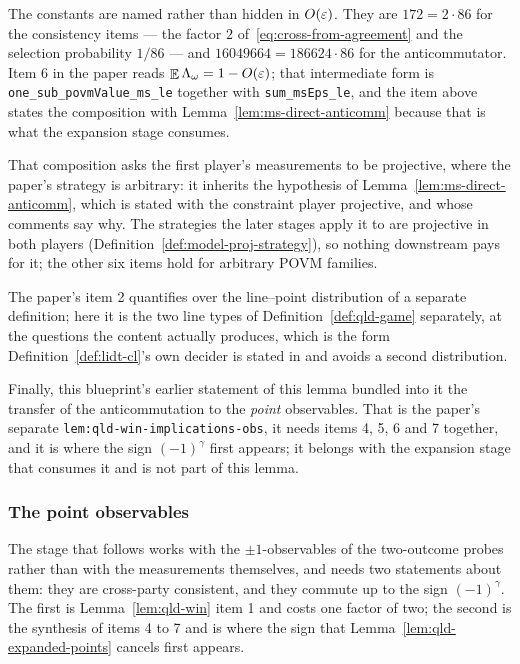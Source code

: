 The constants are named rather than hidden in $O(\varepsilon)$. They are $172 = 2 \cdot 86$ for the
consistency items --- the factor $2$ of~\eqref{eq:cross-from-agreement} and the selection
probability $1/86$ --- and $16049664 = 186624 \cdot 86$ for the anticommutator. Item 6 in the
paper reads $\mathop{\mathbb{E}} \Lambda_\omega = 1 - O(\varepsilon)$; that intermediate form is
\texttt{one\_sub\_povmValue\_ms\_le} together with \texttt{sum\_msEps\_le}, and the item above
states the composition with Lemma~\ref{lem:ms-direct-anticomm} because that is what the
expansion stage consumes.

That composition asks the first player's measurements to be projective, where the paper's strategy
is arbitrary: it inherits the hypothesis of Lemma~\ref{lem:ms-direct-anticomm}, which is stated
with the constraint player projective, and whose comments say why. The strategies the later stages
apply it to are projective in both players (Definition~\ref{def:model-proj-strategy}), so nothing
downstream pays for it; the other six items hold for arbitrary POVM families.

The paper's item 2 quantifies over the line--point distribution of a separate definition; here it
is the two line types of Definition~\ref{def:qld-game} separately, at the questions the content
actually produces, which is the form Definition~\ref{def:lidt-cl}'s own decider is stated in and
avoids a second distribution.

Finally, this blueprint's earlier statement of this lemma bundled into it the transfer of the
anticommutation to the \emph{point} observables. That is the paper's separate
\texttt{lem:qld-win-implications-obs}, it needs items 4, 5, 6 and 7 together, and it is where
the sign $(-1)^{\gamma}$ first appears; it belongs with the expansion stage that consumes it and
is not part of this lemma.

\subsubsection{The point observables}

The stage that follows works with the $\pm 1$-observables of the two-outcome probes rather than
with the measurements themselves, and needs two statements about them: they are cross-party
consistent, and they commute up to the sign $(-1)^{\gamma}$. The first is
Lemma~\ref{lem:qld-win} item 1 and costs one factor of two; the second is the synthesis of items
4 to 7 and is where the sign that Lemma~\ref{lem:qld-expanded-points} cancels first appears.

